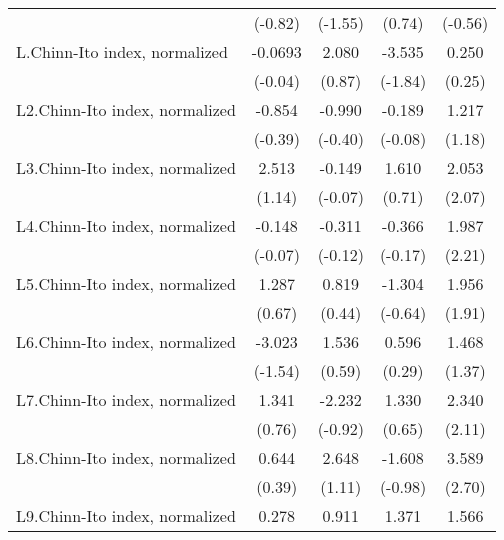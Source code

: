 {\begin{longtable}{l*{4}{c}}
                &  (-0.82)         &  (-1.55)         &   (0.74)         &  (-0.56)         \\
[1em]
L.Chinn-Ito index, normalized&  -0.0693         &    2.080         &   -3.535         &    0.250         \\
                &  (-0.04)         &   (0.87)         &  (-1.84)         &   (0.25)         \\
[1em]
L2.Chinn-Ito index, normalized&   -0.854         &   -0.990         &   -0.189         &    1.217         \\
                &  (-0.39)         &  (-0.40)         &  (-0.08)         &   (1.18)         \\
[1em]
L3.Chinn-Ito index, normalized&    2.513         &   -0.149         &    1.610         &    2.053\sym{*}  \\
                &   (1.14)         &  (-0.07)         &   (0.71)         &   (2.07)         \\
[1em]
L4.Chinn-Ito index, normalized&   -0.148         &   -0.311         &   -0.366         &    1.987\sym{*}  \\
                &  (-0.07)         &  (-0.12)         &  (-0.17)         &   (2.21)         \\
[1em]
L5.Chinn-Ito index, normalized&    1.287         &    0.819         &   -1.304         &    1.956         \\
                &   (0.67)         &   (0.44)         &  (-0.64)         &   (1.91)         \\
[1em]
L6.Chinn-Ito index, normalized&   -3.023         &    1.536         &    0.596         &    1.468         \\
                &  (-1.54)         &   (0.59)         &   (0.29)         &   (1.37)         \\
[1em]
L7.Chinn-Ito index, normalized&    1.341         &   -2.232         &    1.330         &    2.340\sym{*}  \\
                &   (0.76)         &  (-0.92)         &   (0.65)         &   (2.11)         \\
[1em]
L8.Chinn-Ito index, normalized&    0.644         &    2.648         &   -1.608         &    3.589\sym{**} \\
                &   (0.39)         &   (1.11)         &  (-0.98)         &   (2.70)         \\
[1em]
L9.Chinn-Ito index, normalized&    0.278         &    0.911         &    1.371         &    1.566         \\

\end{longtable}}
